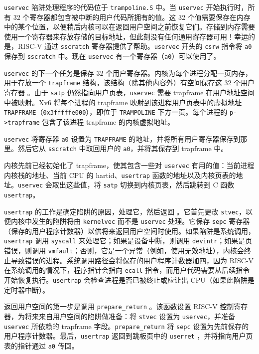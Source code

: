 {\tt uservec} 陷阱处理程序的代码位于 {\tt trampoline.S}  中。当 {\tt uservec} 开始执行时，所有 32 个寄存器都包含被中断的用户代码所拥有的值。这 32 个值需要保存在内存中的某个位置，以便稍后内核可以在返回用户空间之前恢复它们。存储到内存需要使用一个寄存器来存放存储的目标地址，但此刻没有任何通用寄存器可用！幸运的是，RISC-V 通过 {\tt sscratch} 寄存器提供了帮助。{\tt uservec} 开头的 {\tt csrw} 指令将 {\tt a0} 保存到 {\tt sscratch} 中。现在 {\tt uservec} 有一个寄存器（{\tt a0}）可以使用了。

{\tt uservec} 的下一个任务是保存 32 个用户寄存器。内核为每个进程分配一页内存，用于存放一个 {\tt trapframe} 结构，该结构（除其他内容外）有空间保存这 32 个用户寄存器 。由于 {\tt satp} 仍然指向用户页表，{\tt uservec} 需要 trapframe 在用户地址空间中被映射。Xv6 将每个进程的 trapframe 映射到该进程用户页表中的虚拟地址 {\tt TRAPFRAME}（{\tt 0x3fffffe000}），即位于 {\tt TRAMPOLINE} 下方一页。每个进程的 {\tt p->trapframe} 包含了该进程 trapframe 的内核虚拟地址。

{\tt uservec} 将寄存器 {\tt a0} 设置为 {\tt TRAPFRAME} 的地址，并将所有用户寄存器保存到那里。然后它从 {\tt sscratch} 中取回用户的 {\tt a0}，并将其保存到 trapframe 中。

内核先前已经初始化了 trapframe，使其包含一些对 {\tt uservec} 有用的值：当前进程内核栈的地址、当前 CPU 的 hartid、{\tt usertrap} 函数的地址以及内核页表的地址。{\tt uservec} 会取出这些值，将 {\tt satp} 切换到内核页表，然后跳转到 C 函数 {\tt usertrap}。

{\tt usertrap} 的工作是确定陷阱的原因，处理它，然后返回 。它首先更改 {\tt stvec}，以便内核中发生的陷阱将由 {\tt kernelvec} 而不是 {\tt uservec} 处理。它保存 {\tt sepc} 寄存器（保存的用户程序计数器）以供将来返回用户空间时使用。如果陷阱是系统调用，{\tt usertrap} 调用 {\tt syscall} 来处理它；如果是设备中断，则调用 {\tt devintr}；如果是页错误，则调用 {\tt vmfault}；否则，它是一个异常（例如，使用无效地址），内核会终止导致错误的进程。系统调用路径会将保存的用户程序计数器加四，因为 RISC-V 在系统调用的情况下，程序指针会指向 {\tt ecall} 指令，而用户代码需要从后续指令开始恢复执行。{\tt usertrap} 会检查进程是否已被终止或应让出 CPU（如果此陷阱是定时器中断）。

返回用户空间的第一步是调用 {\tt prepare\_return} 。该函数设置 RISC-V 控制寄存器，为将来来自用户空间的陷阱做准备：将 {\tt stvec} 设置为 {\tt uservec}，并准备 {\tt uservec} 所依赖的 trapframe 字段。{\tt prepare\_return} 将 {\tt sepc} 设置为先前保存的用户程序计数器。最后，{\tt usertrap} 返回到跳板页中的 {\tt userret} ，并将指向用户页表的指针通过 {\tt a0} 传回。

